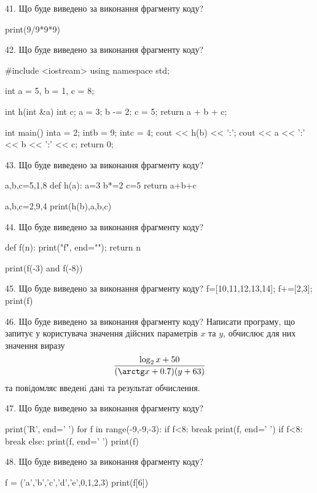 \documentclass[11pt]{article}
\begin{document}

41. Що буде виведено за виконання фрагменту коду?

print(9/9*9*9)


42. Що буде виведено за виконання фрагменту коду?

#include <iostream>
using namespace std;

int a = 5, b = 1, c = 8;

int h(int &a){
int c;    a = 3;
    b -= 2;
    c = 5;
    return a + b + c;
}

int main(){
    inta = 2;
    intb = 9;
    intc = 4;
    cout << h(b) << ':';
    cout << a << ':' << b << ':' << c;
    return 0; 
}


43. Що буде виведено за виконання фрагменту коду?

a,b,c=5,1,8
def h(a):
    a=3
    b*=2
    c=5
    return a+b+c

a,b,c=2,9,4
print(h(b),a,b,c)


44. Що буде виведено за виконання фрагменту коду?

def f(n):
    print("f", end="");
    return n

print(f(-3) and f(-8))


45. Що буде виведено за виконання фрагменту коду?
f=[10,11,12,13,14]; f+=[2,3]; print(f)

46. Що буде виведено за виконання фрагменту коду?
Написати програму, що запитує у користувача значення дійсних параметрів $x$ та $y$, обчислює для них значення виразу 
$$\frac{\log_{2} x + 50}{(\arctg x + 0.7) (y + 63)}$$ 
та повiдомляє введенi данi та результат обчислення.



47. Що буде виведено за виконання фрагменту коду?

print('R', end=' ')
for f in range(-9,-9,-3):
    if f<8:
        break
        print(f, end=' ')
    if f<8:
        break
    else:
        print(f, end=' ')
    print(f)


48. Що буде виведено за виконання фрагменту коду?

f = ('a','b','c','d','e',0,1,2,3)
print(f[6])
\end{document}
